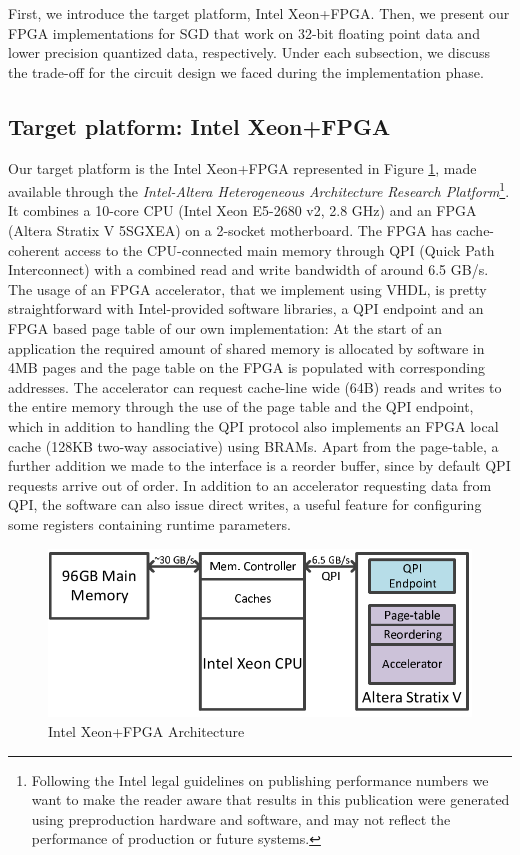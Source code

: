 \documentclass{article}
\begin{document}
First, we introduce the target platform, Intel Xeon+FPGA. Then, we present our FPGA implementations for SGD that work on 32-bit floating point data and lower precision quantized data, respectively. Under each subsection, we discuss the trade-off for the circuit design we faced during the implementation phase.

\subsection{Target platform: Intel Xeon+FPGA}
\label{section:xeonfpga}

Our target platform is the Intel Xeon+FPGA represented in Figure \ref{fig:xeonfpga}, made available through the \textit{Intel-Altera Heterogeneous Architecture Research Platform}\footnote{Following the Intel legal guidelines on publishing performance numbers we want to make the reader aware that results in this publication were generated using preproduction hardware and software, and may not reflect the performance of production or future systems.}. It combines a 10-core CPU (Intel Xeon E5-2680 v2, 2.8 GHz) and an FPGA (Altera Stratix V 5SGXEA) on a 2-socket motherboard. The FPGA has cache-coherent access to the CPU-connected main memory through QPI (Quick Path Interconnect) with a combined read and write bandwidth of around 6.5 GB/s. The usage of an FPGA accelerator, that we implement using VHDL, is pretty straightforward with Intel-provided software libraries, a QPI endpoint and an FPGA based page table of our own implementation: At the start of an application the required amount of shared memory is allocated by software in 4MB pages and the page table on the FPGA is populated with corresponding addresses. The accelerator can request cache-line wide (64B) reads and writes to the entire memory through the use of the page table and the QPI endpoint, which in addition to handling the QPI protocol also implements an FPGA local cache (128KB two-way associative) using BRAMs. Apart from the page-table, a further addition we made to the interface is a reorder buffer, since by default QPI requests arrive out of order. In addition to an accelerator requesting data from QPI, the software can also issue direct writes, a useful feature for configuring some registers containing runtime parameters.

\begin{figure}[t]
\centering
\includegraphics[width=.7\columnwidth]{Figures/XeonFPGA-eps-converted-to.pdf}
\caption{Intel Xeon+FPGA Architecture}
\label{fig:xeonfpga}
\end{figure}
\end{document}
